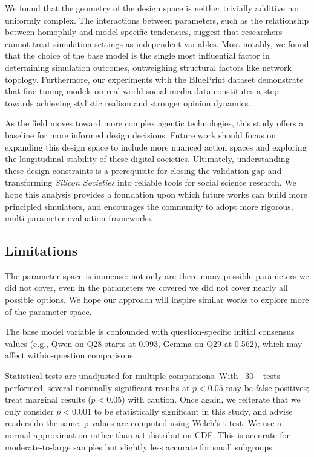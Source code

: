 \documentclass{article} %
\begin{document}
We found that the geometry of the design space is neither trivially additive nor uniformly complex. The interactions between parameters, such as the relationship between homophily and model-specific tendencies, suggest that researchers cannot treat simulation settings as independent variables. Most notably, we found that the choice of the base model is the single most influential factor in determining simulation outcomes, outweighing structural factors like network topology. Furthermore, our experiments with the BluePrint dataset demonstrate that fine-tuning models on real-world social media data constitutes a step towards achieving stylistic realism and stronger opinion dynamics.

As the field moves toward more complex agentic technologies, this study offers a baseline for more informed design decisions. Future work should focus on expanding this design space to include more nuanced action spaces and exploring the longitudinal stability of these digital societies. Ultimately, understanding these design constraints is a prerequisite for closing the validation gap and transforming \textit{Silicon Societies} into reliable tools for social science research. We hope this analysis provides a foundation upon which future works can build more principled simulators, and encourages the community to adopt more rigorous, multi-parameter evaluation frameworks. 

\subsection{Limitations}

The parameter space is immense: not only are there many possible parameters we did not cover, even in the parameters we covered we did not cover nearly all possible options. We hope our approach will inspire similar works to explore more of the parameter space.

The base model variable is confounded with question-specific initial consensus values (e.g., Qwen on Q28 starts at 0.993, Gemma on Q29 at 0.562), which may affect within-question comparisons.

Statistical tests are unadjusted for multiple comparisons. With ~30+ tests performed, several nominally significant results at $p < 0.05$ may be false positives; treat marginal results ($p < 0.05$) with caution. Once again, we reiterate that we only consider $p < 0.001$ to be statistically significant in this study, and advise readers do the same. p-values are computed using Welch's t test. We use a normal approximation rather than a t-distribution CDF. This is accurate for moderate-to-large samples but slightly less accurate for small subgroups.
\end{document}
